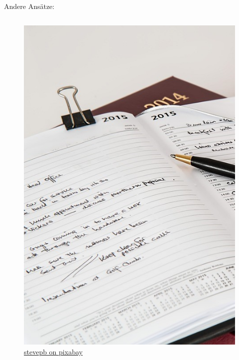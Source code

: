 \documentclass[aspectratio=169,shownotes]{beamer}
\begin{document}
\begin{frame}{Andere Ansätze:}
    \begin{columns}[t]
        \begin{column}{0.3\textwidth}
            \begin{figure}
                \begin{flushleft}
                    \includegraphics[width=\textwidth]{graphics/diary-614149_960_720.jpg}
                    \caption*{\href{https://pixabay.com/de/photos/tagebuch-stift-notizbuch-januar-614149/}{stevepb on pixabay}}    
                \end{flushleft}                
            \end{figure}
            

\end{column}
\end{columns}
\end{frame}
\end{document}
